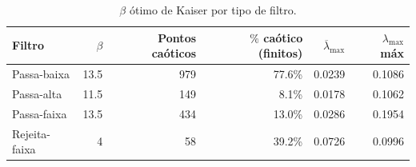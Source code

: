 \begin{table}[htbp]
  \centering
  \caption{$\beta$ ótimo de Kaiser por tipo de filtro.}
  \begin{tabular}{lrrrrr}
    \toprule
    Filtro & $\beta$ & Pontos caóticos & $\%$ caótico (finitos) & $\overline{\lambda}_{\max}$ & $\lambda_{\max}$ máx \\
    \midrule
    Passa-baixa & 13.5 & 979 & 77.6\% & 0.0239 & 0.1086 \\
    Passa-alta & 11.5 & 149 & 8.1\% & 0.0178 & 0.1062 \\
    Passa-faixa & 13.5 & 434 & 13.0\% & 0.0286 & 0.1954 \\
    Rejeita-faixa & 4 & 58 & 39.2\% & 0.0726 & 0.0996 \\
    \bottomrule
  \end{tabular}
\end{table}
